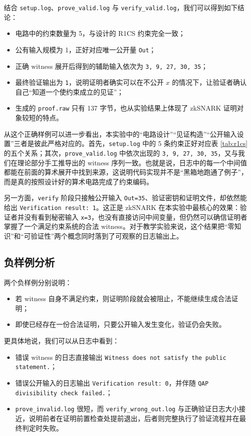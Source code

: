 \documentclass[UTF8,a4paper,10pt]{ctexart}
\begin{document}
结合 \texttt{setup.log}、\texttt{prove\_valid.log} 与 \texttt{verify\_valid.log}，我们可以得到如下结论：
\begin{itemize}
    \item 电路中的约束数量为 5，与设计的 R1CS 约束完全一致；
    \item 公有输入规模为 1，正好对应唯一公开量 \texttt{Out}；
    \item 正确 witness 展开后得到的辅助输入依次为 \texttt{3, 9, 27, 30, 35}；
    \item 最终验证输出为 \texttt{1}，说明证明者确实可以在不公开 $x$ 的情况下，让验证者确认自己“知道一个使约束成立的见证”；
    \item 生成的 \texttt{proof.raw} 只有 137 字节，也从实验结果上体现了 zkSNARK 证明对象较短的特点。
\end{itemize}

从这个正确样例可以进一步看出，本实验中的“电路设计”“见证构造”“公开输入设置”三者是彼此严格对应的。首先，\texttt{setup.log} 中的 5 条约束正好对应表 \ref{tab:r1cs} 的五个关系；其次，\texttt{prove\_valid.log} 中依次出现的 \texttt{3, 9, 27, 30, 35}，又与我们在理论部分手工推导出的 witness 序列一致。也就是说，日志中的每一个中间值都能在前面的算术展开中找到来源，这说明代码实现并不是“黑箱地跑通了例子”，而是真的按照设计好的算术电路完成了约束编码。

另一方面，\texttt{verify} 阶段只接触公开输入 \texttt{Out=35}、验证密钥和证明文件，却依然能给出 \texttt{Verification result: 1}。这正是 zkSNARK 在本实验中最核心的效果：验证者并没有看到秘密输入 \texttt{x=3}，也没有直接访问中间变量，但仍然可以确信证明者掌握了一个满足约束系统的合法 witness。对于教学实验来说，这个结果把“零知识”和“可验证性”两个概念同时落到了可观察的日志输出上。

\subsection{负样例分析}
两个负样例分别说明：
\begin{itemize}
    \item 若 witness 自身不满足约束，则证明阶段就会被阻止，不能继续生成合法证明；
    \item 即使已经存在一份合法证明，只要公开输入发生变化，验证仍会失败。
\end{itemize}

更具体地说，我们可以从日志中看到：
\begin{itemize}
    \item 错误 witness 的日志直接输出 \texttt{Witness does not satisfy the public statement.}；
    \item 错误公开输入的日志输出 \texttt{Verification result: 0}，并伴随 \texttt{QAP divisibility check failed.}；
    \item \texttt{prove\_invalid.log} 很短，而 \texttt{verify\_wrong\_out.log} 与正确验证日志大小接近，说明前者在证明前置检查处提前退出，后者则完整执行了验证流程并在最终判定时失败。
\end{itemize}
\end{document}
